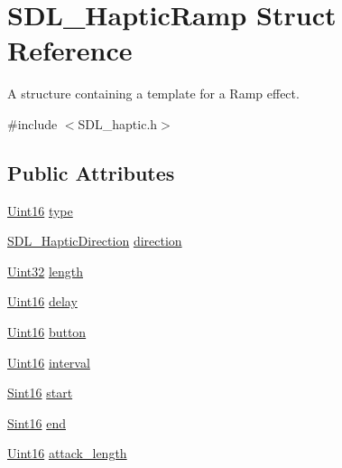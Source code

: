 \hypertarget{struct_s_d_l___haptic_ramp}{}\section{S\+D\+L\+\_\+\+Haptic\+Ramp Struct Reference}
\label{struct_s_d_l___haptic_ramp}


A structure containing a template for a Ramp effect.  




{\ttfamily \#include $<$S\+D\+L\+\_\+haptic.\+h$>$}

\subsection*{Public Attributes}
\begin{DoxyCompactItemize}
\item 
\hyperlink{_s_d_l__stdinc_8h_a31fcc0a076c9068668173ee26d33e42b}{Uint16} \hyperlink{struct_s_d_l___haptic_ramp_aca1c2349372433822ab62f60976640aa}{type}
\item 
\hyperlink{struct_s_d_l___haptic_direction}{S\+D\+L\+\_\+\+Haptic\+Direction} \hyperlink{struct_s_d_l___haptic_ramp_a6fb6c67ccf262b8f3ec08bcdf08f9965}{direction}
\item 
\hyperlink{_s_d_l__stdinc_8h_add440eff171ea5f55cb00c4a9ab8672d}{Uint32} \hyperlink{struct_s_d_l___haptic_ramp_a57e75237507701405af2a3caf34cdb5a}{length}
\item 
\hyperlink{_s_d_l__stdinc_8h_a31fcc0a076c9068668173ee26d33e42b}{Uint16} \hyperlink{struct_s_d_l___haptic_ramp_ac9471016f41919b4a1c786bbd649a777}{delay}
\item 
\hyperlink{_s_d_l__stdinc_8h_a31fcc0a076c9068668173ee26d33e42b}{Uint16} \hyperlink{struct_s_d_l___haptic_ramp_a2027c6fd88f1ebe652c90c71410ee0bf}{button}
\item 
\hyperlink{_s_d_l__stdinc_8h_a31fcc0a076c9068668173ee26d33e42b}{Uint16} \hyperlink{struct_s_d_l___haptic_ramp_a4b89d108cfa7e96ea58b58771334c33d}{interval}
\item 
\hyperlink{_s_d_l__stdinc_8h_a9d0257032c0e146ab6121bf0122712f5}{Sint16} \hyperlink{struct_s_d_l___haptic_ramp_acc0e813ac6399290fd4a788d2471e8d4}{start}
\item 
\hyperlink{_s_d_l__stdinc_8h_a9d0257032c0e146ab6121bf0122712f5}{Sint16} \hyperlink{struct_s_d_l___haptic_ramp_a16dd3ee307795248e21ee45ba8fb4c6c}{end}
\item 
\hyperlink{_s_d_l__stdinc_8h_a31fcc0a076c9068668173ee26d33e42b}{Uint16} \hyperlink{struct_s_d_l___haptic_ramp_adbcd7ffb05016d442c73e81cc0fcbbd2}{attack\+\_\+length}

\end{DoxyCompactItemize}
